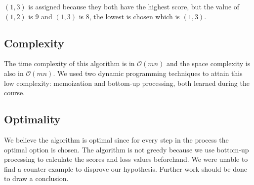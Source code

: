 \documentclass[paper=a4, fontsize=11pt]{scrartcl} %
\numberwithin{equation}{section} %
\numberwithin{figure}{section} %
\numberwithin{table}{section} %
\begin{document}
$(1,3)$ is assigned because they both have the highest score, but the value of $(1,2)$ is $9$ and $(1,3)$ is $8$, the lowest is chosen which is $(1,3)$. 


\subsection{Complexity}

The time complexity of this algorithm is in $\mathcal{O}(mn)$ and the space complexity is also in $\mathcal{O}(mn)$.
We used two dynamic programming techniques to attain this low complexity: memoization and bottom-up processing, both learned during the course.

\subsection{Optimality}
We believe the algorithm is optimal since for every step in the process the optimal option is chosen.
The algorithm is not greedy because we use bottom-up processing to calculate the scores and loss values beforehand.
We were unable to find a counter example to disprove our hypothesis.
Further work should be done to draw a conclusion.
\end{document}
